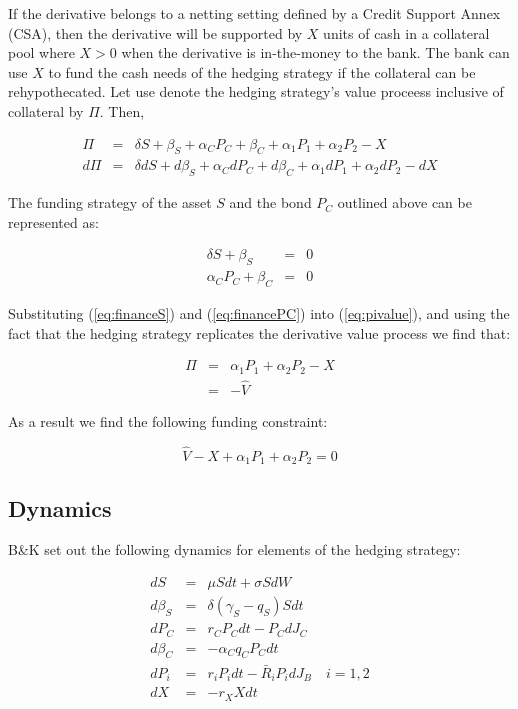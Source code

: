 \documentclass{tufte-handout}
\begin{document}
If the derivative belongs to a netting setting defined by a Credit Support
Annex (CSA), then the derivative will be supported by $X$ units of cash in
a collateral pool where $X>0$ when the derivative is in-the-money to the bank.
The bank can use $X$ to fund the cash needs of the hedging strategy if
the collateral can be rehypothecated. Let use denote the hedging strategy's value
proceess inclusive of collateral by $\Pi$. Then,

\begin{eqnarray}
  \Pi & = & \delta S + \beta_S + \alpha_C P_C + \beta_C +
          \alpha_1 P_1 + \alpha_2 P_2 - X \label{eq:pivalue} \\
  d\Pi & = & \delta dS + d\beta_S + \alpha_C dP_C + d\beta_C +
          \alpha_1 dP_1 + \alpha_2 dP_2 - dX \label{eq:pidelta}
\end{eqnarray}

The funding strategy of the asset $S$ and the bond $P_C$ outlined above can be
represented as:

\begin{eqnarray}
  \delta S + \beta_S & = & 0 \label{eq:financeS} \\
  \alpha_C P_C + \beta_C & = & 0 \label{eq:financePC}
\end{eqnarray}

Substituting (\ref{eq:financeS}) and (\ref{eq:financePC}) into (\ref{eq:pivalue}),
and using the fact that the hedging strategy replicates the derivative value
process we find that:

\begin{eqnarray*}
  \Pi & = & \alpha_1 P_1 + \alpha_2 P_2 - X \\
      & = & -\hat{V}
\end{eqnarray*}

As a result we find the following funding constraint:

\begin{equation}\label{eq:fundingconstraint}
  \hat{V} - X + \alpha_1 P_1 + \alpha_2 P_2 = 0
\end{equation}

\subsection{Dynamics}\label{sec:dynamics}

B\&K set out the following dynamics for elements of the hedging strategy:

\begin{eqnarray}
  dS       & = & \mu S dt + \sigma S dW \label{eq:dynstart}\\
  d\beta_S & = & \delta (\gamma_S - q_S) S dt \\
  dP_C     & = & r_C P_C dt - P_C dJ_C \\
  d\beta_C & = &  -\alpha_C q_C P_C dt \\
  dP_i     & = & r_i P_i dt - \bar{R}_i P_i dJ_B \quad i = 1, 2\\
  dX       & = & -r_X X dt \label{eq:dynend}
\end{eqnarray}
\end{document}
